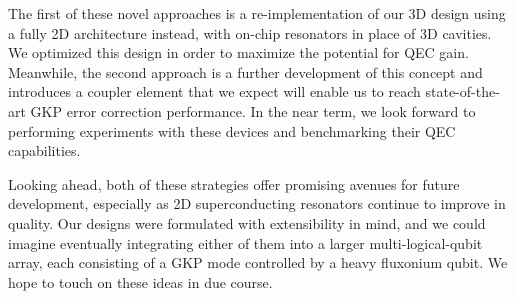 The first of these novel approaches is a re-implementation of our 3D design using a fully 2D architecture instead, with on-chip resonators in place of 3D cavities. We optimized this design in order to maximize the potential for QEC gain. Meanwhile, the second approach is a further development of this concept and introduces a coupler element that we expect will enable us to reach state-of-the-art GKP error correction performance. In the near term, we look forward to performing experiments with these devices and benchmarking their QEC capabilities. 

Looking ahead, both of these strategies offer promising avenues for future development, especially as 2D superconducting resonators continue to improve in quality. Our designs were formulated with extensibility in mind, and we could imagine eventually integrating either of them into a larger multi-logical-qubit array, each consisting of a GKP mode controlled by a heavy fluxonium qubit. We hope to touch on these ideas in due course. 
